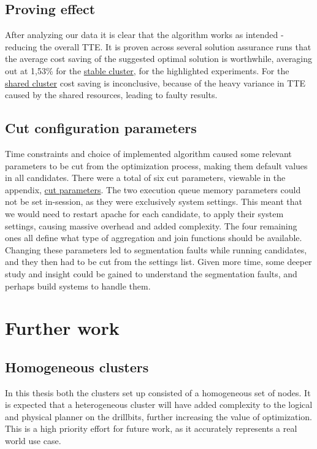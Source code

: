 \documentclass[a4paper,english]{report}
\begin{document}
	\section{Proving effect}
	 After analyzing our data it is clear that the algorithm works as intended - reducing the overall TTE. It is proven across several solution assurance runs that the average cost saving of the suggested optimal solution is worthwhile, averaging out at 1,53\% for the \hyperref[table:cluster_stable]{stable cluster}, for the highlighted experiments. For the \hyperref[table:cluster_shared]{shared cluster} cost saving is inconclusive, because of the heavy variance in TTE caused by the shared resources, leading to faulty results.
	\section{Cut configuration parameters}
	Time constraints and choice of implemented algorithm caused some relevant parameters to be cut from the optimization process, making them default values in all candidates. There were a total of six cut parameters, viewable in the appendix, \hyperref[table:removed_params]{cut parameters}. The two execution queue memory parameters could not be set in-session, as they were exclusively system settings. This meant that we would need to restart apache for each candidate, to apply their system settings, causing massive overhead and added complexity. The four remaining ones all define what type of aggregation and join functions should be available. Changing these parameters led to segmentation faults while running candidates, and they then had to be cut from the settings list. Given more time, some deeper study and insight could be gained to understand the segmentation faults, and perhaps build systems to handle them.
	
	\chapter{Further work}
	\section{Homogeneous clusters}
	In this thesis both the clusters set up consisted of a homogeneous set of nodes. It is expected that a heterogeneous cluster will have added complexity to the logical and physical planner on the drillbits, further increasing the value of optimization. This is a high priority effort for future work, as it accurately represents a real world use case.
\end{document}
